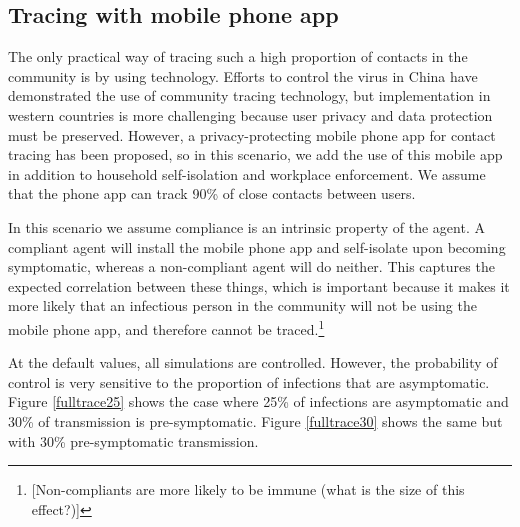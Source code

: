 \documentclass{article}
\begin{document}
\subsection{Tracing with mobile phone app}

The only practical way of tracing such a high proportion of contacts in the community is by using technology. Efforts to control the virus in China have demonstrated the use of community tracing technology, but implementation in western countries is more challenging because user privacy and data protection must be preserved. However, a privacy-protecting mobile phone app for contact tracing has been proposed\cite{tang2020Mobile}, so in this scenario, we add the use of this mobile app in addition to household self-isolation and workplace enforcement. We assume that the phone app can track 90\% of close contacts between users.

In this scenario we assume compliance is an intrinsic property of the agent. A compliant agent will install the mobile phone app and self-isolate upon becoming symptomatic, whereas a non-compliant agent will do neither. This captures the expected correlation between these things, which is important because it makes it more likely that an infectious person in the community will not be using the mobile phone app, and therefore cannot be traced.\footnote{[Non-compliants are more likely to be immune (what is the size of this effect?)]}

At the default values, all simulations are controlled. However, the probability of control is very sensitive to the proportion of infections that are asymptomatic. Figure \ref{fulltrace25} shows the case where 25\% of infections are asymptomatic and 30\% of transmission is pre-symptomatic. Figure \ref{fulltrace30} shows the same but with 30\% pre-symptomatic transmission.
\end{document}
